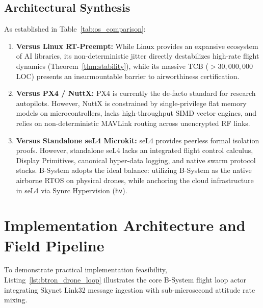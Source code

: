 \documentclass[10pt,journal,compsoc,twocolumn]{article}
\begin{document}
\subsection{Architectural Synthesis}
As established in Table~\ref{tab:os_comparison}:
\begin{enumerate}[leftmargin=*]
    \item \textbf{Versus Linux RT-Preempt:} While Linux provides an expansive ecosystem of AI libraries, its non-deterministic jitter directly destabilizes high-rate flight dynamics (Theorem~\ref{thm:stability}), while its massive TCB ($>30{,}000{,}000$ LOC) presents an insurmountable barrier to airworthiness certification.
    \item \textbf{Versus PX4 / NuttX:} PX4 is currently the de-facto standard for research autopilots. However, NuttX is constrained by single-privilege flat memory models on microcontrollers, lacks high-throughput SIMD vector engines, and relies on non-deterministic MAVLink routing across unencrypted RF links.
    \item \textbf{Versus Standalone seL4 Microkit:} seL4 provides peerless formal isolation proofs. However, standalone seL4 lacks an integrated flight control calculus, Display Primitives, canonical hyper-data logging, and native swarm protocol stacks. B-System adopts the ideal balance: utilizing B-System as the native airborne RTOS on physical drones, while anchoring the cloud infrastructure in seL4 via Synrc Hypervision (\texttt{hv}).
\end{enumerate}

\section{Implementation Architecture and Field Pipeline}
\label{sec:impl}

To demonstrate practical implementation feasibility, Listing~\ref{lst:btron_drone_loop} illustrates the core B-System flight loop actor integrating Skynet Link32 message ingestion with sub-microsecond attitude rate mixing.
\end{document}
